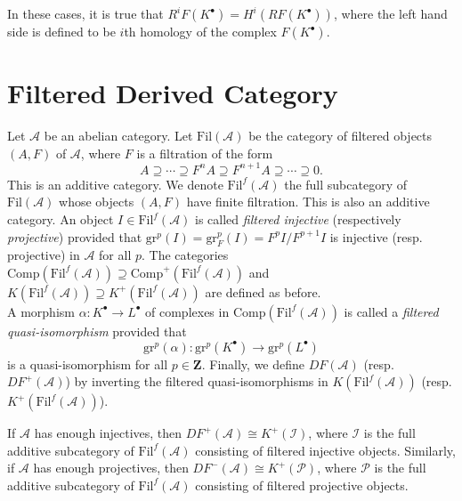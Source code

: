 \begin{remark} 
In these cases, it is true that $R^iF(K^\bullet) = H^i(RF(K^\bullet))$, where 
the left hand side is defined to be $i$th homology of the complex 
$F(K^\bullet)$.  
\end{remark}

\section{Filtered Derived Category}

\begin{definition}
Let $\mathcal{A}$ be an abelian category. Let $\text{Fil}(\mathcal{A})$ be the 
category of filtered objects $(A,F)$ of $\mathcal{A}$, where $F$ is a 
filtration of the form
$$
A \supseteq \cdots \supseteq F^n A \supseteq F^{n+1}A \supseteq \cdots 
\supseteq 0.
$$
This is an additive category. We denote $\text{Fil}^f(\mathcal{A})$ the full 
subcategory of $\text{Fil}(\mathcal{A})$ whose objects $(A,F)$ have finite 
filtration.  This is also an additive category. An object $I \in 
\text{Fil}^f(\mathcal{A})$ is called \emph{filtered injective} (respectively 
\emph{projective}) provided that $\text{gr}^p(I) = \text{gr}_F^p(I) = 
F^pI/F^{p+1}I$ is injective (resp. projective) in $\mathcal{A}$ for all $p$. 
The categories $\text{Comp}(\text{Fil}^f(\mathcal{A})) \supseteq 
\text{Comp}^+(\text{Fil}^f(\mathcal{A}))$ and $K(\text{Fil}^f(\mathcal{A})) 
\supseteq K^+(\text{Fil}^f(\mathcal A))$ are defined as before.
\\
A morphism $\alpha : K^\bullet \to L^\bullet$ of complexes in 
$\text{Comp}(\text{Fil}^f(\mathcal{A}))$ is called a \emph{filtered 
quasi-isomorphism} provided that 
$$
\mathrm{gr}^p(\alpha): \mathrm{gr}^p(K^\bullet) \to \mathrm{gr}^p(L^\bullet)
$$ 
is a quasi-isomorphism for all $p \in \mathbf{Z}$. Finally, we define $D 
F(\mathcal{A})$ (resp. $D F^+(\mathcal{A})$) by inverting the filtered 
quasi-isomorphisms in $K(\text{Fil}^f(\mathcal{A}))$ (resp. 
$K^+(\text{Fil}^f(\mathcal{A}))$). 
\end{definition}

\begin{lemma}
If $\mathcal{A}$ has enough injectives, then $D F^+(\mathcal{A}) \cong 
K^+(\mathcal{I})$, where $\mathcal{I}$ is the full additive subcategory of 
$\text{Fil}^f(\mathcal{A})$ consisting of filtered injective objects. 
Similarly, if $\mathcal{A}$ has enough projectives, then $D F^-(\mathcal{A}) 
\cong K^+(\mathcal{P})$, where $\mathcal P$ is the full additive subcategory of 
$\text{Fil}^f(\mathcal{A})$ consisting of filtered projective objects.
\end{lemma}

